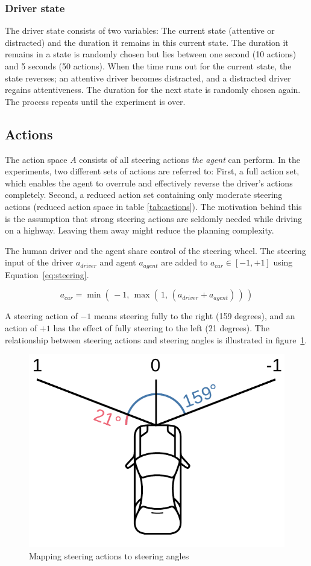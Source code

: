 \subsubsection*{Driver state}
\label{sec:driver_state}
The driver state consists of two variables: The current state (attentive or distracted) and the duration it remains in this current state. The duration it remains in a state is randomly chosen but lies between one second (10 actions) and 5 seconds (50 actions). When the time runs out for the current state, the state reverses; an attentive driver becomes distracted, and a distracted driver regains attentiveness. The duration for the next state is randomly chosen again. The process repeats until the experiment is over.

\subsection{Actions}
\label{sec:actions}

The action space $A$ consists of all steering actions \emph{the agent} can perform. In the experiments, two different sets of actions are referred to: First, a full action set, which enables the agent to overrule and effectively reverse the driver's actions completely. Second, a reduced action set containing only moderate steering actions (reduced action space in table \ref{tab:actions}). The motivation behind this is the assumption that strong steering actions are seldomly needed while driving on a highway. Leaving them away might reduce the planning complexity.

The human driver and the agent share control of the steering wheel. The steering input of the driver $a_{driver}$ and agent $a_{agent}$ are added to $a_{car} \in [-1, +1]$ using Equation~\ref{eq:steering}.

\begin{equation}
    a_{car} = \min(\, -1, \, \max(\, 1, \, (a_{driver} + a_{agent})\,)\,)
    \label{eq:steering}
\end{equation}

A steering action of $-1$ means steering fully to the right (159 degrees), and an action of $+1$ has the effect of fully steering to the left (21 degrees). The relationship between steering actions and steering angles is illustrated in figure~\ref{fig:steer-angle}.

\begin{figure}[htbp]
    \includegraphics[width=0.3\linewidth]{figures/steering-angle.pdf}
    \centering
    \caption{Mapping steering actions to steering angles}
    \label{fig:steer-angle}
\end{figure}

